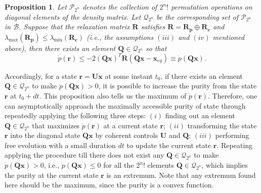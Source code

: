 \documentclass[prl,aps,twocolumn, reprint, amsmath,amssymb,showpacs,superscriptaddress]{revtex4}
\newtheorem*{proposition}{Proposition}
\begin{document}
\begin{proposition}
Let $\mathcal{P}_{2^n}$ denotes the collection of $2^n!$ permutation operations on diagonal elements of the density matrix. Let $\mathcal{Q}_{2^n}$ be the corresponding set of $\mathcal{P}_{2^n}$ in $\mathcal{B}$. Suppose that the relaxation matrix $\mathbf{R}$ satisfies $\mathbf{R} =  \mathbf{R_p} \oplus \mathbf{R_c}$ and ${\lambda _{\max }}({\mathbf{R_p}}) \le {\lambda _{\min }}({\mathbf{R_c}})$ (i.e., the assumptions $(iii)$ and $(iv)$ mentioned above), then there exists an element $\mathbf{Q} \in \mathcal{Q}_{2^n}$ so that
\begin{equation}
\label{prop1}
\dot p(\bm{r})  \le  - 2{(\mathbf{Q}{\bm{x}})^T}\mathbf{R}(\mathbf{Q}{\bm{x}} - {\bm{x}_{eq}}) \equiv \dot p(\mathbf{Q}\bm{x})  .
\end{equation}
\end{proposition}

Accordingly, for a state $\bm{r} = \mathbf{U} \bm{x} $ at some instant $ t_0$, if there exists an element $\mathbf{Q} \in \mathcal{Q}_{2^n}$ to make $\dot p(\mathbf{Q}\bm{x}) > 0$, it is possible to increase the purity from the state $\bm{r}$ at $t_0 + dt$. This proposition also tells us the maximum of $\dot p(\bm{r})$.
Therefore, one can asymptotically approach the maximally accessible purity of state through repeatedly applying the following three steps: $(i)$ finding out an element $\mathbf{Q} \in \mathcal{Q}_{2^n}$ that maximizes $\dot p(\bm{r}) $ at a current state $\bm{r}$; $(ii)$ transforming the state $\bm{r}$ into the diagonal state $\mathbf{Q} \bm{x}$ by coherent controls $\mathbf{U}$ and $\mathbf{Q}$; $(iii)$ performing free evolution with a small duration $dt$ to update the current state $\bm{r}$.  Repeating applying the procedure till there does not exist any $\mathbf{Q} \in \mathcal{Q}_{2^n}$ to make $ \dot p(\mathbf{Q}\bm{x}) > 0$, i.e., $\dot p(\mathbf{Q}\bm{x}) \le 0 $ for all the $2^n!$ elements $\mathbf{Q} \in \mathcal{Q}_{2^n}$, which implies the purity at the current state $\bm{r}$ is an extremum. Note that any extremum found here should be the maximum, since the purity is a convex function.
\end{document}
